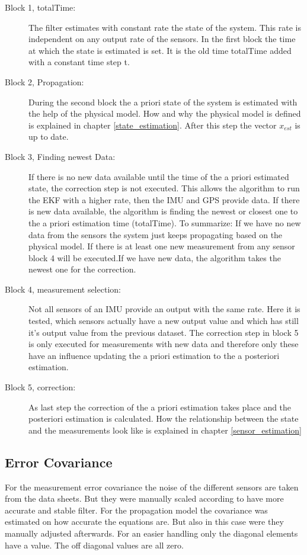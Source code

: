 \begin{description}
\item[Block 1, totalTime:]
The filter estimates with constant rate the state of the system. This rate is independent on any output rate of the sensors. In the first block the time at which the state is estimated is set. It is the old time totalTime added with a constant time step t.

\item[Block 2, Propagation:]
During the second block the a priori state of the system is estimated with the help of the physical model. How and why the physical model is defined is explained in chapter \ref{state_estimation}. After this step the vector $x_{est}$ is up to date.

\item[Block 3, Finding newest Data:]
If there is no new data available until the time of the a priori estimated state, the correction step is not executed. This allows the algorithm to run the EKF with a higher rate, then the IMU and GPS provide data. If there is new data available, the algorithm is finding the newest or closest one to the a priori estimation time (totalTime). To summarize: If we have no new data from the sensors the system just keeps propagating based on the physical model. If there is at least one new measurement from any sensor block 4 will be executed.If we have new data, the algorithm takes the newest one for the correction.

\item[Block 4, measurement selection:]
Not all sensors of an IMU provide an output with the same rate. Here it is tested, which sensors actually have a new output value and which has still it's output value from the previous dataset. The correction step in block 5 is only executed for measurements with new data and therefore only these have an influence updating the a priori estimation to the a posteriori estimation.

\item[Block 5, correction:]
As last step the correction of the a priori estimation takes place and the posteriori estimation is calculated. How the relationship between the state and the measurements look like is explained in chapter \ref{sensor_estimation}
\end{description}


\subsection*{Error Covariance}
For the measurement error covariance the noise of the different sensors are taken from the data sheets. But they were manually scaled according to have more accurate and stable filter. For the propagation model the covariance was estimated on how accurate the equations are. But also in this case were they manually adjusted afterwards. For an easier handling only the diagonal elements have a value. The off diagonal values are all zero.

